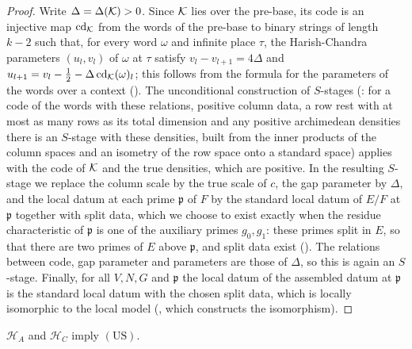 \begin{proof}
Write $\Delta=\Delta(\mathcal K)>0$. Since $\mathcal K$ lies over the pre-base, its code is an injective map $\mathrm{cd}_\mathcal K$ from the words of the
pre-base to binary strings of length $k-2$ such that, for every word $\omega$ and infinite place $\tau$, the Harish-Chandra parameters
$(u_l,v_l)$ of $\omega$ at $\tau$ satisfy $v_l-v_{l+1}=4\Delta$ and $u_{l+1}=v_l-\frac12-\Delta\,\mathrm{cd}_\mathcal K(\omega)_l$; this follows from
the formula for the parameters of the words over a context (). The unconditional construction of $S$-stages
(: for a code of the words with these relations, positive column data, a row rest with at
most as many rows as its total dimension and any positive archimedean densities there is an $S$-stage with these densities, built from the inner
products of the column spaces and an isometry of the row space onto a standard space) applies with the code of $\mathcal K$ and the true densities,
which are positive. In the resulting $S$-stage we replace the column scale by the true scale of $c$, the gap parameter by $\Delta$, and the local
datum at each prime $\mathfrak p$ of $F$ by the standard local datum of $E/F$ at $\mathfrak p$ together with split data, which we choose to exist
exactly when the residue characteristic of $\mathfrak p$ is one of the auxiliary primes $g_0,g_1$: these primes split in $E$, so that there are
two primes of $E$ above $\mathfrak p$, and split data exist (). The relations between code,
gap parameter and parameters are those of $\Delta$, so this is again an $S$-stage. Finally, for all $V,N,G$ and $\mathfrak p$ the local datum of
the assembled datum at $\mathfrak p$ is the standard local datum with the chosen split data, which is locally isomorphic to the local model
(, which constructs the isomorphism).
\end{proof}

\begin{proposition}\label{pf:bundles:prop:US}
$\mathcal H_A$ and $\mathcal H_C$ imply $(\mathrm{US})$.
\end{proposition}

